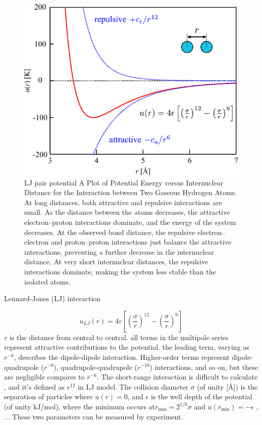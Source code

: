 \begin{figure}[h]
\begin{centering}
\includegraphics[scale=0.82]{_figure/lj-centre}
\par\end{centering}

\caption[LJ pair potential]{LJ pair potential A Plot of Potential Energy versus Internuclear
Distance for the Interaction between Two Gaseous Hydrogen Atoms. At
long distances, both attractive and repulsive interactions are small.
As the distance between the atoms decreases, the attractive electron–proton
interactions dominate, and the energy of the system decreases. At
the observed bond distance, the repulsive electron–electron and proton–proton
interactions just balance the attractive interactions, preventing
a further decrease in the internuclear distance. At very short internuclear
distances, the repulsive interactions dominate, making the system
less stable than the isolated atoms.\label{fig:LJ-pair-potential}}
\end{figure}


Lennard-Jones (LJ) interaction

\begin{equation}
u_{LJ}(r)=4\varepsilon\left[\left(\frac{\sigma}{r}\right)^{12}-\left(\frac{\sigma}{r}\right)^{6}\right]
\end{equation}
$r$ is the distance from central to central. all terms in the multipole
series represent attractive contributions to the potential. the leading
term, varying as $r^{-6}$, describes the dipole-dipole interaction.
Higher-order terms represent dipole-quadrupole ($r^{-8}$), quadrupole-quadrupole
($r^{-10}$) interactions, and so on, but these are negligible compares
to $r^{-6}$. The short-range interaction is difficult to calculate
, and it's defined as $r^{12}$ in LJ model. The collision diameter
$\sigma$ (of unity {[}$\textrm{\AA}${]}) is the separation of particles
where $u(r)=0$, and $\epsilon$ is the well depth of the potential
(of unity $\mathrm{kJ/mol}$), where the minimum occurs at$r_{\min}=2^{1/6}\sigma$
and $u(r_{\min})=-\epsilon$ ,\textcolor{red}{{} ...} These two parameters
can be measured by experiment. 

